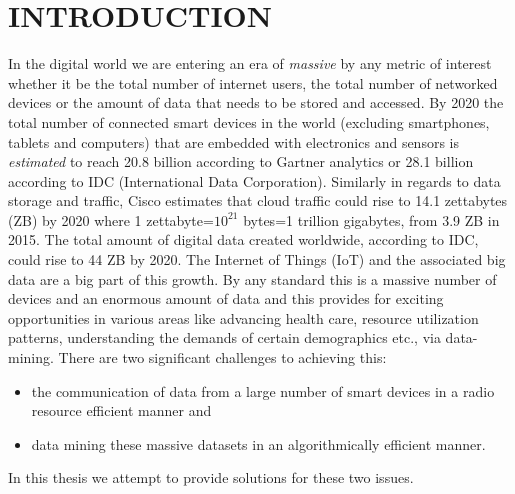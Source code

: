 %
%
%
%



\pagestyle{plain} %
\setcounter{page}{1}

\chapter{\uppercase {Introduction}}

\indent In the digital world we are entering an era of \textit{massive} by any metric of interest whether it be the total number of internet users, the total number of networked devices or the amount of data that needs to be stored and accessed. By 2020 the total number of connected smart devices in the world (excluding smartphones, tablets and computers) that are embedded with electronics and sensors is \textit{estimated} to reach 20.8 billion according to Gartner analytics or 28.1 billion according to IDC (International Data Corporation). Similarly in regards to data storage and traffic, Cisco estimates that cloud traffic could rise to 14.1 zettabytes (ZB) by 2020 where 1 zettabyte=$10^{21}$ bytes=1 trillion gigabytes, from 3.9 ZB in 2015. The total amount of digital data created worldwide, according to IDC, could rise to 44 ZB by 2020. The Internet of Things (IoT) and the associated big data are a big part of this growth. By any standard this is a massive number of devices and an enormous amount of data and this provides for exciting opportunities in various areas like advancing health care, resource utilization patterns, understanding the demands of certain demographics etc.,  via data-mining. There are two significant challenges to achieving this:
\begin{itemize}
\item the communication of data from a large number of smart devices in a radio resource efficient manner and 
\item data mining these massive datasets in an algorithmically efficient manner.
\end{itemize}
In this thesis we attempt to provide solutions for these two issues.
